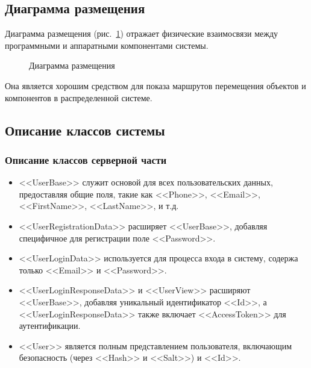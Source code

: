 \subsection{Диаграмма размещения}

Диаграмма размещения (рис.~\ref{place:image}) отражает физические взаимосвязи между программными и аппаратными компонентами системы.

\begin{figure}[ht]
\caption{Диаграмма размещения}
\label{place:image}
\end{figure}

Она является хорошим средством для показа маршрутов перемещения объектов и компонентов в распределенной системе.

\subsection{Описание классов системы}

\subsubsection{Описание классов серверной части}

\begin{itemize}
    \item <<UserBase>> служит основой для всех пользовательских данных, предоставляя общие поля, такие как <<Phone>>, <<Email>>, <<FirstName>>, <<LastName>>, и т.д.
    \item <<UserRegistrationData>> расширяет <<UserBase>>, добавляя специфичное для регистрации поле <<Password>>.
    \item <<UserLoginData>> используется для процесса входа в систему, содержа только <<Email>> и <<Password>>.
    \item <<UserLoginResponseData>> и <<UserView>> расширяют <<UserBase>>, добавляя уникальный идентификатор <<Id>>, а <<UserLoginResponseData>> также включает <<AccessToken>> для аутентификации.
    \item <<User>> является полным представлением пользователя, включающим безопасность (через <<Hash>> и <<Salt>>) и <<Id>>.
\end{itemize}

